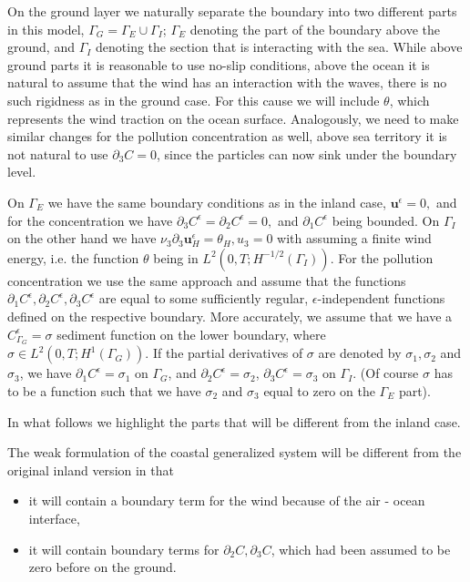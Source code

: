 \documentclass[11pt]{article}
\begin{document}
On the ground layer we naturally separate the boundary into two different parts in this model, $\Gamma_G = \Gamma_E \cup \Gamma_I$; $\Gamma_E$ denoting the part of the boundary above the ground, and $\Gamma_I$ denoting the section that is interacting with the sea. While above ground parts it is reasonable to use no-slip conditions, above the ocean it is natural to assume that the wind has an interaction with the waves, there is no such rigidness as in the ground case. For this cause we will include $\theta$, which represents the wind traction on the ocean surface. Analogously, we need to make similar changes for the pollution concentration as well, above sea territory it is not natural to use $\partial_3 C = 0$, since the particles can now sink under the boundary level.

On $\Gamma_E$ we have the same boundary conditions as in the inland case, $\mathbf{u}^\epsilon = 0,$ and for the concentration we have $\partial_3 C^\epsilon = \partial_2 C^\epsilon = 0,$ and $\partial_1 C^\epsilon$ being bounded. On $\Gamma_I$ on the other hand we have $\nu_3 \partial_3 \mathbf{u}^\epsilon_H = \theta_H, u_3 = 0$ with assuming a finite wind energy, i.e. the function $\theta$ being in $L^2(0,T; H^{-1/2}(\Gamma_I))$. For the pollution concentration we use the same approach and assume that the functions $\partial_1 C^\epsilon, \partial_2 C^\epsilon, \partial_3 C^\epsilon$ are equal to some sufficiently regular, $\epsilon$-independent functions defined on the respective boundary. More accurately, we assume that we have a $C^\epsilon_{\Gamma_G} = \sigma$ sediment function on the lower boundary, where $\sigma \in L^2(0,T;H^1(\Gamma_G))$. If the partial derivatives of $\sigma$ are denoted by $\sigma_1, \sigma_2$ and $\sigma_3$, we have $\partial_1 C^\epsilon = \sigma_1$ on $\Gamma_G$, and $\partial_2 C^\epsilon = \sigma_2$, $\partial_3 C^\epsilon = \sigma_3$ on $\Gamma_I$. (Of course $\sigma$ has to be a function such that we have $\sigma_2$ and $\sigma_3$ equal to zero on the $\Gamma_E$ part).

In what follows we highlight the parts that will be different from the inland case. 

The weak formulation of the coastal generalized system will be different from the original inland version in that
\begin{itemize}
  \item it will contain a boundary term for the wind because of the air - ocean interface,
  \item it will contain boundary terms for $\partial_2 C, \partial_3 C$, which had been assumed to be zero before on the ground.
\end{itemize}
\end{document}
